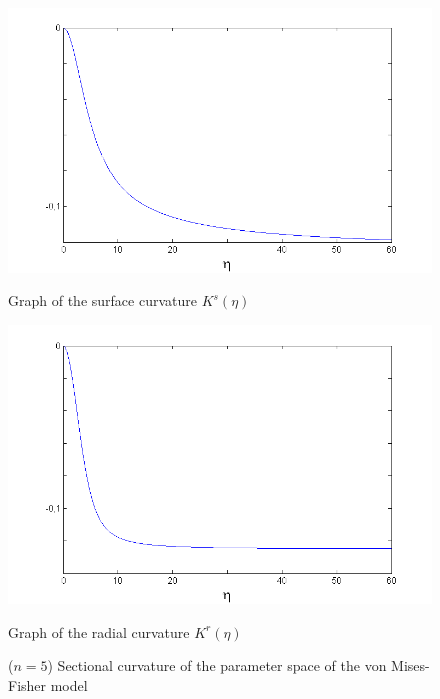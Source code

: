 \documentclass{svmult}
\begin{document}
\begin{figure}[!h]
\centering
  \centering
  \includegraphics[width=0.9\linewidth]{Figures/n5ks1}
  \caption*{Graph of the surface curvature $K^s(\eta)$}
  \label{fig2}
  \centering
  \includegraphics[width=0.9\linewidth]{Figures/n5kr1}
  \caption*{Graph of the radial curvature $K^r(\eta)$}
  \label{fig:hn2}
\caption{($n = 5$) Sectional curvature of the parameter space of the von Mises-Fisher model}
\label{fig3}
\end{figure}

$\phantom{here}$
\vfill
\pagebreak



    


\vfill
\pagebreak

\end{document}
